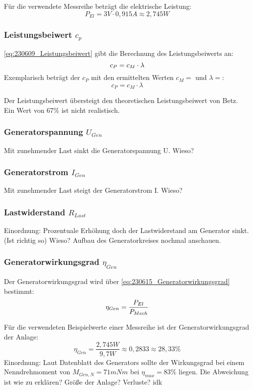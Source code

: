 Für die verwendete Messreihe beträgt die elektrische Leistung:
$$P_{El} = 3V \cdot 0,915A \approx 2,745W$$


\subsubsection*{Leistungsbeiwert $c_p$}
\autoref{eq:230609_Leistungsbeiwert} gibt die Berechnung des Leistungsbeiwerts an:
 \begin{equation}
     \centering
     c_P = c_M \cdot \lambda
     \label{eq:230615_Leistungsbeiwert}
 \end{equation}
Exemplarisch beträgt der $c_P$ mit den ermittelten Werten $c_M = $ und $\lambda =$:
 $$c_P = c_M \cdot \lambda$$

 Der Leistungsbeiwert übersteigt den theoretischen Leistungsbeiwert von Betz. Ein Wert von 67\% ist nicht realistisch.

\subsubsection*{Generatorspannung $U_{Gen}$}
Mit zunehmender Last sinkt die Generatorspannung U. Wieso?
\subsubsection*{Generatorstrom $I_{Gen}$}
Mit zunehmender Last steigt der Generatorstrom I. Wieso?
\subsubsection*{Lastwiderstand $R_{Last}$}
Einordnung: Prozentuale Erhöhung doch der Lastwiderstand am Generator sinkt. (Ist richtig so) Wieso? Aufbau des Generatorkreises nochmal anschauen.
\subsubsection*{Generatorwirkungsgrad $\eta_{Gen}$}
Der Generatorwirkungsgrad wird über \autoref{eq:230615_Generatorwirkungsgrad} bestimmt:
\begin{equation}
    \centering
    \eta_{Gen} = \frac{P_{El}}{P_{Mech}}
    \label{eq:230615_Generatorwirkungsgrad}
\end{equation}

Für die verwendeten Beispielwerte einer Messreihe ist der Generatorwirkungsgrad der Anlage:
$$\eta_{Gen} = \frac{2,745W}{9,7W} \approx 0,2833 \approx 28,33\% $$
Einordnung:
Laut Datenblatt des Generators sollte der Wirkungsgrad bei einem Nenndrehmoment von $M_{Gen,N}= 71 mNm$ bei $\eta_{max}=83\%$ liegen.
Die Abweichung ist wie zu erklären? Größe der Anlage? Verluste? idk
